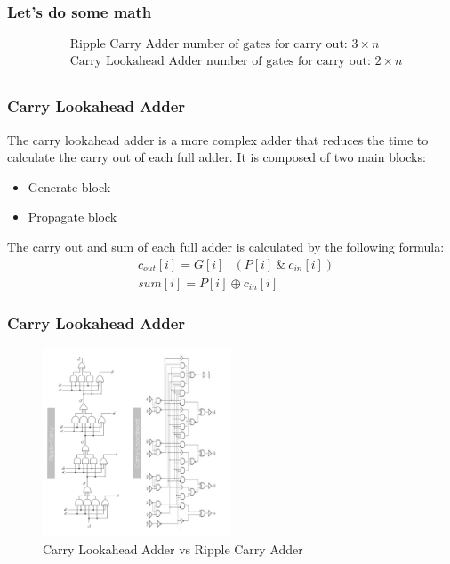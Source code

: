 \begin{frame}
    \frametitle{Let's do some math}
    \begin{equation}
        \begin{aligned}
            & \text{Ripple Carry Adder number of gates for carry out: } 3 \times n\\
            & \text{Carry Lookahead Adder number of gates for carry out: } 2 \times n\\
        \end{aligned}
    \end{equation}
\end{frame}


\begin{frame}
    \frametitle{Carry Lookahead Adder}
    The carry lookahead adder is a more complex adder that reduces the time to calculate the carry out of each full adder. It is composed of two main blocks:
    \begin{itemize}
        \item Generate block
        \item Propagate block
    \end{itemize}
    The carry out and sum of each full adder is calculated by the following formula:
    \begin{equation}
        \begin{aligned}
            &c_{out}[i]=G[i] \ | \ (P[i] \ \& \ c_{in}[i])\\
            &sum[i]=P[i] \oplus c_{in}[i]
        \end{aligned}
    \end{equation}

\end{frame}

\begin{frame}
    \frametitle{Carry Lookahead Adder}
    \begin{figure}
        \centering
        \includegraphics[width=0.5\textwidth, angle=270 ]{media/adders_comparison.jpg}
        \caption{Carry Lookahead Adder vs Ripple Carry Adder}
    \end{figure}
\end{frame}


